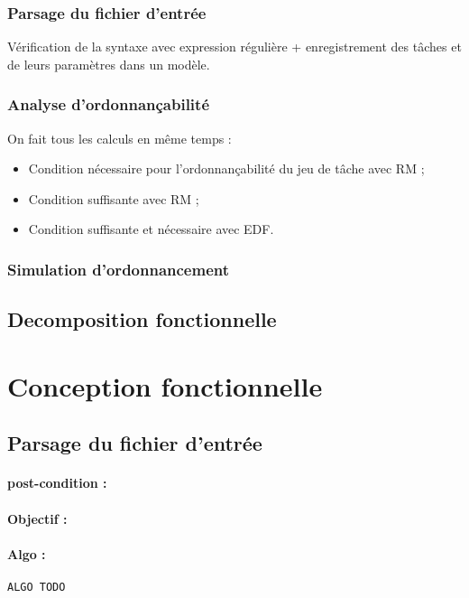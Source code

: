 			\subsubsection{Parsage du fichier d'entrée}
				Vérification de la syntaxe avec expression régulière + enregistrement des tâches et de leurs paramètres dans un modèle.
			
			\subsubsection{Analyse d'ordonnançabilité}
				On fait tous les calculs en même temps :
				\begin{itemize}
					\item Condition nécessaire pour l'ordonnançabilité du jeu de tâche avec RM ;
					\item Condition suffisante avec RM ;
					\item Condition suffisante et nécessaire avec EDF.
				\end{itemize}
			
			\subsubsection{Simulation d'ordonnancement}
			
		\subsection{Decomposition fonctionnelle}

	\section{Conception fonctionnelle}
	
		\subsection{Parsage du fichier d'entrée}
				\paragraph{post-condition :} 
				\paragraph{Objectif :} 
				\paragraph{Algo :} 
					\begin{verbatim}
ALGO TODO
					\end{verbatim}
		

